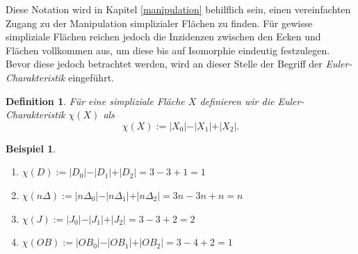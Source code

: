 \documentclass[12pt,titlepage,twoside,cleardoublepage]{article}
\theoremstyle{nummermitklammern}
\newtheorem{vor}[temp]{Vorüberlegung}
\newtheorem{bsp}[temp]{Beispiel}
\newtheorem{definition}[temp]{Definition}
\newtheorem{definition}[zahl]{Definition}
\newtheorem{vor}[zahl]{Vorüberlegung}
\newtheorem{bsp}[zahl]{Beispiel}
\numberwithin{equation}{section}
\begin{document}
Diese Notation wird in Kapitel \ref{manipulation} behilflich sein, einen vereinfachten Zugang zu der Manipulation simplizialer Flächen zu finden. Für gewisse simpliziale Flächen reichen jedoch die Inzidenzen zwischen den Ecken und Flächen vollkommen aus, um diese bis auf Isomorphie eindeutig festzulegen. Bevor diese jedoch betrachtet werden, wird an dieser Stelle der Begriff der \emph{Euler-Charakteristik} eingeführt.
\begin{definition}
Für eine simpliziale Fläche $X$ definieren wir die \emph{Euler-Charakteristik} $\chi (X)$ als 
\[
\chi(X):=\vert X_0\vert-\vert X_1\vert+\vert X_2\vert.
\]
\end{definition}
\begin{bsp}
\begin{enumerate}
Beim Betrachten der im obigem Beispiel eingeführten simplizialen Flächen ergeben sich folgende Euler-Charakteristiken:
\item $\chi(D):=\vert D_0\vert-\vert D_1\vert+\vert D_2\vert=3-3+1=1$
\item $\chi(n\Delta):=\vert n\Delta_0\vert-\vert n\Delta_1\vert+\vert n\Delta_2\vert=3n-3n+n=n$
\item $\chi(J):=\vert J_0\vert-\vert J_1\vert+\vert J_2\vert=3-3+2=2$
\item $\chi(OB):=\vert OB_0\vert-\vert OB_1\vert+\vert OB_2\vert=3-4+2=1$
\end{enumerate}
\end{bsp}


\end{document}
